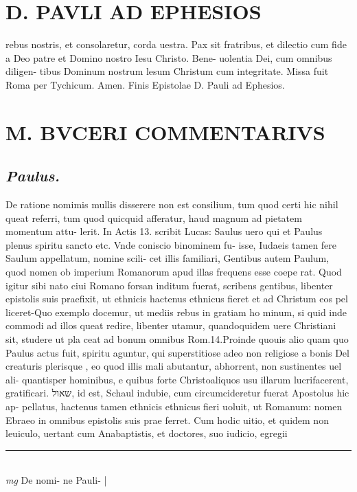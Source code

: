 \documentclass{article}
\begin{document}
\begin{pages}
\section*{D. PAVLI AD EPHESIOS }
\marginpar{[ p.9.  ]}\pstart rebus nostris, et consolaretur, corda uestra.  Pax sit fratribus, et dilectio cum fide a Deo patre et Domino nostro Iesu Christo. Bene- uolentia Dei, cum omnibus diligen- tibus Dominum nostrum lesum Christum cum integritate. Missa fuit Roma per Tychicum. Amen.  Finis Epistolae D. Pauli ad Ephesios.  \pend
\section*{M. BVCERI COMMENTARIVS }
\marginpar{[ p.17 ]}
{}
\subsection*{\textit{Paulus. }}\pstart De ratione nomimis mullis disserere non est consilium, tum quod certi hic nihil queat referri, tum quod quicquid afferatur, haud magnum ad pietatem momentum attu- lerit. In Actis 13. scribit Lucas: Saulus uero qui et Paulus plenus spiritu sancto etc. Vnde coniscio binominem fu- isse, Iudaeis tamen fere Saulum appellatum, nomine scili- cet illis familiari, Gentibus autem Paulum, quod nomen ob imperium Romanorum apud illas frequens esse coepe rat. Quod igitur sibi nato ciui Romano forsan inditum fuerat, scribens gentibus, libenter epistolis suis praefixit, ut ethnicis hactenus ethnicus fieret et ad Christum eos pel liceret-Quo exemplo docemur, ut mediis rebus in gratiam ho minum, si quid inde commodi ad illos queat redire, libenter utamur, quandoquidem uere Christiani sit, studere ut pla ceat ad bonum omnibus Rom.14.Proinde quouis alio quam quo Paulus actus fuit, spiritu aguntur, qui superstitiose adeo non religiose a bonis Del creaturis plerisque , eo quod illis mali abutantur, abhorrent, non sustinentes uel ali- quantisper hominibus, e quibus forte Christoaliquos usu illarum lucrifacerent, gratificari. שאול, id est, Schaul indubie, cum circumcideretur fuerat Apostolus hic ap- pellatus, hactenus tamen ethnicis ethnicus fieri uoluit, ut Romanum: nomen Ebraeo in omnibus epistolis suis prae ferret. Cum hodic uitio, et quidem non leuiculo, uertant cum Anabaptistis, et doctores, suo iudicio, egregii  \pend
\vspace{0.5cm}\noindent
\vspace{0.2cm}\rule{1cm}{0.2pt}\\ 
\hspace{0.2cm}\textit{mg}
\footnotesize De nomi- ne Pauli- 
\normalsize| 

\end{pages}
\end{document}
